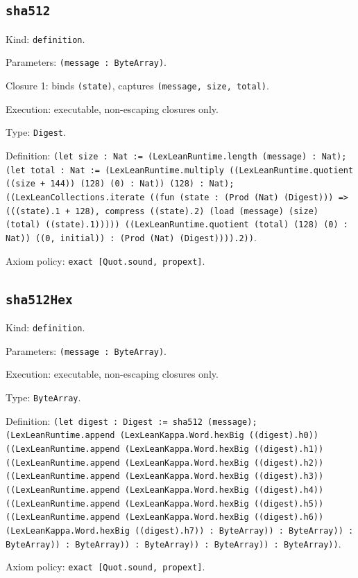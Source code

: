 \documentclass[11pt]{article}
\begin{document}
\subsection*{\texttt{sha512}}
\noindent Kind: \texttt{definition}.\par
\noindent Parameters: \texttt{(message : ByteArray)}.\par
\noindent Closure 1: binds \texttt{(state)}, captures \texttt{(message, size, total)}.\par
\noindent Execution: executable, non-escaping closures only.\par
\noindent Type: \texttt{Digest}.\par
\noindent Definition: \texttt{(let size : Nat := (LexLeanRuntime.length (message) : Nat); (let total : Nat := (LexLeanRuntime.multiply ((LexLeanRuntime.quotient ((size + 144)) (128) (0) : Nat)) (128) : Nat); ((LexLeanCollections.iterate ((fun (state : (Prod (Nat) (Digest))) => (((state).1 + 128), compress ((state).2) (load (message) (size) (total) ((state).1))))) ((LexLeanRuntime.quotient (total) (128) (0) : Nat)) ((0, initial)) : (Prod (Nat) (Digest)))).2))}.\par
\noindent Axiom policy: \texttt{exact [Quot.sound, propext]}.\par
\subsection*{\texttt{sha512Hex}}
\noindent Kind: \texttt{definition}.\par
\noindent Parameters: \texttt{(message : ByteArray)}.\par
\noindent Execution: executable, non-escaping closures only.\par
\noindent Type: \texttt{ByteArray}.\par
\noindent Definition: \texttt{(let digest : Digest := sha512 (message); (LexLeanRuntime.append (LexLeanKappa.Word.hexBig ((digest).h0)) ((LexLeanRuntime.append (LexLeanKappa.Word.hexBig ((digest).h1)) ((LexLeanRuntime.append (LexLeanKappa.Word.hexBig ((digest).h2)) ((LexLeanRuntime.append (LexLeanKappa.Word.hexBig ((digest).h3)) ((LexLeanRuntime.append (LexLeanKappa.Word.hexBig ((digest).h4)) ((LexLeanRuntime.append (LexLeanKappa.Word.hexBig ((digest).h5)) ((LexLeanRuntime.append (LexLeanKappa.Word.hexBig ((digest).h6)) (LexLeanKappa.Word.hexBig ((digest).h7)) : ByteArray)) : ByteArray)) : ByteArray)) : ByteArray)) : ByteArray)) : ByteArray)) : ByteArray))}.\par
\noindent Axiom policy: \texttt{exact [Quot.sound, propext]}.\par
\end{document}
